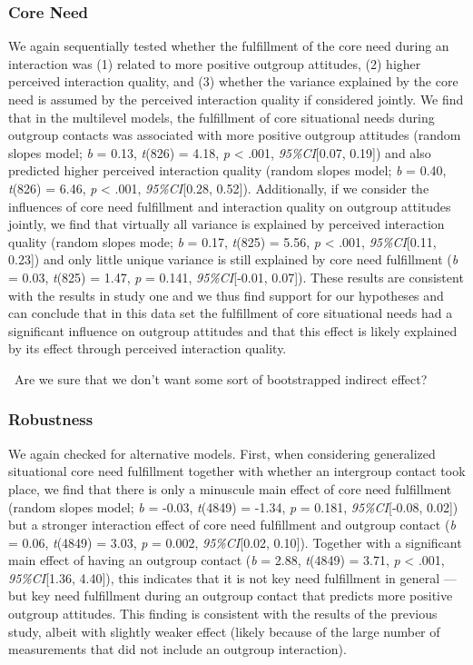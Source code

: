 \subsubsection{Core Need}

We again sequentially tested whether the fulfillment of the core need
during an interaction was (1) related to more positive outgroup
attitudes, (2) higher perceived interaction quality, and (3) whether the
variance explained by the core need is assumed by the perceived
interaction quality if considered jointly. We find that in the
multilevel models, the fulfillment of core situational needs during
outgroup contacts was associated with more positive outgroup attitudes
(random slopes model; \textit{b} = 0.13, \textit{t}(826) = 4.18,
\textit{p} \textless{} .001, \textit{95\%CI}{[}0.07, 0.19{]}) and also
predicted higher perceived interaction quality (random slopes model;
\textit{b} = 0.40, \textit{t}(826) = 6.46, \textit{p} \textless{} .001,
\textit{95\%CI}{[}0.28, 0.52{]}). Additionally, if we consider the
influences of core need fulfillment and interaction quality on outgroup
attitudes jointly, we find that virtually all variance is explained by
perceived interaction quality (random slopes mode; \textit{b} = 0.17,
\textit{t}(825) = 5.56, \textit{p} \textless{} .001,
\textit{95\%CI}{[}0.11, 0.23{]}) and only little unique variance is
still explained by core need fulfillment (\textit{b} = 0.03,
\textit{t}(825) = 1.47, \textit{p} = 0.141, \textit{95\%CI}{[}-0.01,
0.07{]}). These results are consistent with the results in study one and
we thus find support for our hypotheses and can conclude that in this
data set the fulfillment of core situational needs had a significant
influence on outgroup attitudes and that this effect is likely explained
by its effect through perceived interaction quality.

\faQuestionCircle~Are we sure that we don't want some sort of
bootstrapped indirect effect?

\subsubsection{Robustness}

We again checked for alternative models. First, when considering
generalized situational core need fulfillment together with whether an
intergroup contact took place, we find that there is only a minuscule
main effect of core need fulfillment (random slopes model; \textit{b} =
-0.03, \textit{t}(4849) = -1.34, \textit{p} = 0.181,
\textit{95\%CI}{[}-0.08, 0.02{]}) but a stronger interaction effect of
core need fulfillment and outgroup contact (\textit{b} = 0.06,
\textit{t}(4849) = 3.03, \textit{p} = 0.002, \textit{95\%CI}{[}0.02,
0.10{]}). Together with a significant main effect of having an outgroup
contact (\textit{b} = 2.88, \textit{t}(4849) = 3.71, \textit{p}
\textless{} .001, \textit{95\%CI}{[}1.36, 4.40{]}), this indicates that
it is not key need fulfillment in general --- but key need fulfillment
during an outgroup contact that predicts more positive outgroup
attitudes. This finding is consistent with the results of the previous
study, albeit with slightly weaker effect (likely because of the large
number of measurements that did not include an outgroup interaction).

